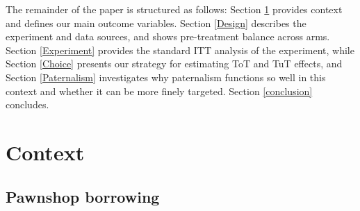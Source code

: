 \documentclass[oneside,11pt]{article}
\begin{document}






The remainder of the paper is structured as follows:  Section \ref{context} provides context and defines our main outcome variables. Section \ref{Design} describes the experiment and data sources, and shows pre-treatment balance across arms. Section \ref{Experiment} provides the standard ITT analysis of the experiment, while Section \ref{Choice} presents our strategy for estimating ToT and TuT effects, and Section \ref{Paternalism} investigates why paternalism functions so well in this context and whether it can be more finely targeted.  Section \ref{conclusion} concludes.






\section{Context} \label{context}

\subsection{Pawnshop borrowing}
    
\end{document}
